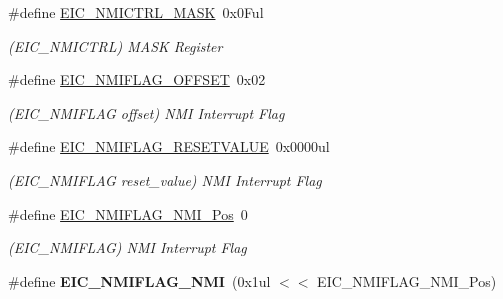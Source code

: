 \begin{DoxyCompactItemize}
\item 
\hypertarget{group___s_a_m_l21___e_i_c_gaf52070ecba91c5d7d6ece825763d5ac3}{}\#define \hyperlink{group___s_a_m_l21___e_i_c_gaf52070ecba91c5d7d6ece825763d5ac3}{E\+I\+C\+\_\+\+N\+M\+I\+C\+T\+R\+L\+\_\+\+M\+A\+S\+K}~0x0\+Ful\label{group___s_a_m_l21___e_i_c_gaf52070ecba91c5d7d6ece825763d5ac3}

\begin{DoxyCompactList}\small\item\em (E\+I\+C\+\_\+\+N\+M\+I\+C\+T\+R\+L) M\+A\+S\+K Register \end{DoxyCompactList}\item 
\hypertarget{group___s_a_m_l21___e_i_c_gaaf1e851a2bf7b57210d255b797305b5a}{}\#define \hyperlink{group___s_a_m_l21___e_i_c_gaaf1e851a2bf7b57210d255b797305b5a}{E\+I\+C\+\_\+\+N\+M\+I\+F\+L\+A\+G\+\_\+\+O\+F\+F\+S\+E\+T}~0x02\label{group___s_a_m_l21___e_i_c_gaaf1e851a2bf7b57210d255b797305b5a}

\begin{DoxyCompactList}\small\item\em (E\+I\+C\+\_\+\+N\+M\+I\+F\+L\+A\+G offset) N\+M\+I Interrupt Flag \end{DoxyCompactList}\item 
\hypertarget{group___s_a_m_l21___e_i_c_gabdc3ee824c8c2631f56077b9eb4af6c0}{}\#define \hyperlink{group___s_a_m_l21___e_i_c_gabdc3ee824c8c2631f56077b9eb4af6c0}{E\+I\+C\+\_\+\+N\+M\+I\+F\+L\+A\+G\+\_\+\+R\+E\+S\+E\+T\+V\+A\+L\+U\+E}~0x0000ul\label{group___s_a_m_l21___e_i_c_gabdc3ee824c8c2631f56077b9eb4af6c0}

\begin{DoxyCompactList}\small\item\em (E\+I\+C\+\_\+\+N\+M\+I\+F\+L\+A\+G reset\+\_\+value) N\+M\+I Interrupt Flag \end{DoxyCompactList}\item 
\hypertarget{group___s_a_m_l21___e_i_c_gae75faeffe2957a80cbdacf5c0239e2af}{}\#define \hyperlink{group___s_a_m_l21___e_i_c_gae75faeffe2957a80cbdacf5c0239e2af}{E\+I\+C\+\_\+\+N\+M\+I\+F\+L\+A\+G\+\_\+\+N\+M\+I\+\_\+\+Pos}~0\label{group___s_a_m_l21___e_i_c_gae75faeffe2957a80cbdacf5c0239e2af}

\begin{DoxyCompactList}\small\item\em (E\+I\+C\+\_\+\+N\+M\+I\+F\+L\+A\+G) N\+M\+I Interrupt Flag \end{DoxyCompactList}\item 
\hypertarget{group___s_a_m_l21___e_i_c_gadeb5d88236a7732ba0c74a95460abf51}{}\#define {\bfseries E\+I\+C\+\_\+\+N\+M\+I\+F\+L\+A\+G\+\_\+\+N\+M\+I}~(0x1ul $<$$<$ E\+I\+C\+\_\+\+N\+M\+I\+F\+L\+A\+G\+\_\+\+N\+M\+I\+\_\+\+Pos)\label{group___s_a_m_l21___e_i_c_gadeb5d88236a7732ba0c74a95460abf51}


\end{DoxyCompactItemize}
